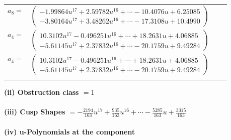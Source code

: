 \documentclass[1p]{elsarticle_modified}
\theoremstyle{definition}
\begin{document}
\begin{tabular}{m{7pt} m{180pt} m{7pt} m{180pt} }
\flushright $a_{8}=$&$\begin{pmatrix}-1.99864 u^{17}+2.59782 u^{16}+\cdots-10.4076 u+6.25085\\-3.80164 u^{17}+3.48262 u^{16}+\cdots-17.3108 u+10.4990\end{pmatrix}$ \\
\flushright $a_{4}=$&$\begin{pmatrix}10.3102 u^{17}-0.496251 u^{16}+\cdots+18.2631 u+4.06885\\-5.61145 u^{17}+2.37832 u^{16}+\cdots-20.1759 u+9.49284\end{pmatrix}$\\ \flushright $a_{4}=$&$\begin{pmatrix}10.3102 u^{17}-0.496251 u^{16}+\cdots+18.2631 u+4.06885\\-5.61145 u^{17}+2.37832 u^{16}+\cdots-20.1759 u+9.49284\end{pmatrix}$\\&\end{tabular}
\flushleft \textbf{(ii) Obstruction class $= 1$}\\~\\
\flushleft \textbf{(iii) Cusp Shapes $= -\frac{2194}{163} u^{17}+\frac{935}{163} u^{16}+\cdots-\frac{5285}{163} u+\frac{3315}{163}$}\\~\\
\newpage\renewcommand{\arraystretch}{1}
\flushleft \textbf{(iv) u-Polynomials at the component}\newline \\
\end{document}
